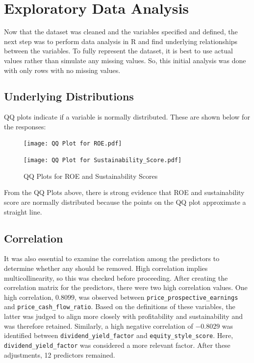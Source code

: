 \documentclass[11pt]{report} %
\begin{document}
\section{Exploratory Data Analysis}
Now that the dataset was cleaned and the variables specified and defined, the next step was to perform data analysis in R and find underlying relationships between the variables. To fully represent the dataset, it is best to use actual values rather than simulate any missing values. So, this initial analysis was done with only rows with no missing values.
\vspace{-0.3cm}
\subsection{Underlying Distributions}
QQ plots indicate if a variable is normally distributed. These are shown below for the responses:
\begin{figure}[H]
    \centering
    \begin{minipage}[b]{0.38\textwidth}
        \centering
        \texttt{[image: QQ Plot for ROE.pdf]} %
    \end{minipage}
    \hfill
    \begin{minipage}[b]{0.4\textwidth}
        \centering
        \texttt{[image: QQ Plot for Sustainability\_Score.pdf]} %
    \end{minipage}
    \caption{QQ Plots for ROE and Sustainability Scores}
    \label{fig:sidebyside_minipage}
\end{figure}

\noindent From the QQ Plots above, there is strong evidence that ROE and sustainability score are normally distributed because the points on the QQ plot approximate a straight line.

\vspace{-0.3cm}
\subsection{Correlation}
\label{Correlation and Multi-Collinearity}
It was also essential to examine the correlation among the predictors to determine whether any should be removed. High correlation implies multicollinearity, so this was checked before proceeding. After creating the correlation matrix for the predictors, there were two high correlation values. One high correlation, \( 0.8099 \), was observed between \texttt{price\_prospective\_earnings} and \texttt{price\_cash\_flow\_ratio}. Based on the definitions of these variables, the latter was judged to align more closely with profitability and sustainability and was therefore retained.
Similarly, a high negative correlation of \( -0.8029 \) was identified between \texttt{dividend\_yield\_factor} and \texttt{equity\_style\_score}. Here, \texttt{dividend\_yield\_factor} was considered a more relevant factor. After these adjustments, 12 predictors remained.
\end{document}
